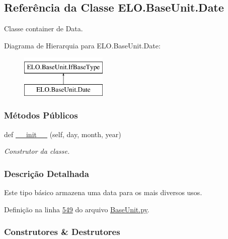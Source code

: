 \hypertarget{classELO_1_1BaseUnit_1_1Date}{}\subsection{Referência da Classe E\+L\+O.\+Base\+Unit.\+Date}
\label{classELO_1_1BaseUnit_1_1Date}


Classe container de Data.  


Diagrama de Hierarquia para E\+L\+O.\+Base\+Unit.\+Date\+:\begin{figure}[H]
\begin{center}
\leavevmode
\includegraphics[height=2.000000cm]{d2/d74/classELO_1_1BaseUnit_1_1Date}
\end{center}
\end{figure}
\subsubsection*{Métodos Públicos}
\begin{DoxyCompactItemize}
\item 
def \hyperlink{classELO_1_1BaseUnit_1_1Date_a816a4b72fd768bd6150fa785159b5803}{\+\_\+\+\_\+init\+\_\+\+\_\+} (self, day, month, year)
\begin{DoxyCompactList}\small\item\em Construtor da classe. \end{DoxyCompactList}\end{DoxyCompactItemize}


\subsubsection{Descrição Detalhada}
Este tipo básico armazena uma data para os mais diversos usos. 

Definição na linha \hyperlink{BaseUnit_8py_source_l00549}{549} do arquivo \hyperlink{BaseUnit_8py_source}{Base\+Unit.\+py}.



\subsubsection{Construtores \& Destrutores}
\hypertarget{classELO_1_1BaseUnit_1_1Date_a816a4b72fd768bd6150fa785159b5803}{}
